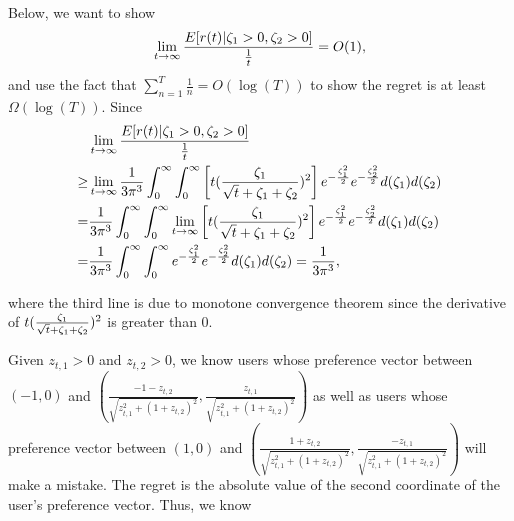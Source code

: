 Below, we want to show 
\begin{align}
\lim_{t\rightarrow\infty}\frac{E[r(t)| \Noise{1}>0, \Noise{2}>0]}{\frac{1}{t}} = O(1), \nonumber
\end{align}
and use the fact that $\sum_{n=1}^{T}\frac{1}{n}=O(\log(T))$ to show the regret is at least $\Omega(\log(T))$. Since
\begin{align}
&\lim_{t\rightarrow \infty}\frac{E[r(t)| \Noise{1}>0, \Noise{2}>0]}{\frac{1}{t}} \nonumber \\
\geq & \lim_{t\rightarrow \infty}\frac{1}{3\pi^3}\int_{0}^{\infty} \int_{0}^{\infty}\left[ t(\frac{\Noise{1}}{\sqrt{t}+\Noise{1}+\Noise{2}})^2\right]e^{-\frac{\Noise{1}^2}{2}}e^{-\frac{\Noise{2}^2}{2}}d(\Noise{1})d(\Noise{2}) \nonumber  \\
= & \frac{1}{3\pi^3}\int_{0}^{\infty} \int_{0}^{\infty}\lim_{t\rightarrow \infty}\left[ t(\frac{\Noise{1}}{\sqrt{t}+\Noise{1}+\Noise{2}})^2\right]e^{-\frac{\Noise{1}^2}{2}}e^{-\frac{\Noise{2}^2}{2}}d(\Noise{1})d(\Noise{2}) \nonumber  \\
=&\frac{1}{3\pi^3}\int_{0}^{\infty} \int_{0}^{\infty}e^{-\frac{\Noise{1}^2}{2}}e^{-\frac{\Noise{2}^2}{2}}d(\Noise{1})d(\Noise{2}) = \frac{1}{3\pi^3}, \nonumber
\end{align}

where the third line is due to monotone convergence theorem since the derivative of $t(\frac{\Noise{1}}{\sqrt{t}+\Noise{1}+\Noise{2}})^2$ is greater than $0$.



  
Given $z_{t,1}>0$ and $z_{t,2}>0$, we know users whose preference vector between $(-1,0)$ and $\left(\frac{-1-z_{t,2}}{\sqrt{z_{t,1}^2+(1+z_{t,2})^2}}, \frac{z_{t,1}}{\sqrt{z_{t,1}^2+(1+z_{t,2})^2}}\right)$ as well as users whose preference vector between $(1,0)$ and $\left(\frac{1+z_{t,2}}{\sqrt{z_{t,1}^2+(1+z_{t,2})^2}}, \frac{-z_{t,1}}{\sqrt{z_{t,1}^2+(1+z_{t,2})^2}}\right)$ will make a mistake. The regret is the absolute value of the second coordinate of the user's preference vector. Thus, we know

